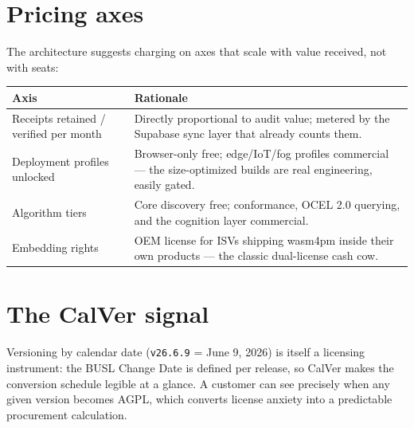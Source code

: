 \section{Pricing axes}

The architecture suggests charging on axes that scale with value received,
not with seats:

\begin{center}
\begin{tabularx}{\textwidth}{lX}
\toprule
\textbf{Axis} & \textbf{Rationale} \\
\midrule
Receipts retained / verified per month & Directly proportional to audit value; metered by the Supabase sync layer that already counts them. \\
Deployment profiles unlocked & Browser-only free; edge/IoT/fog profiles commercial --- the size-optimized builds are real engineering, easily gated. \\
Algorithm tiers & Core discovery free; conformance, OCEL 2.0 querying, and the cognition layer commercial. \\
Embedding rights & OEM license for ISVs shipping wasm4pm inside their own products --- the classic dual-license cash cow. \\
\bottomrule
\end{tabularx}
\end{center}

\section{The CalVer signal}

Versioning by calendar date (\texttt{v26.6.9} = June 9, 2026) is itself a
licensing instrument: the BUSL Change Date is defined per release, so CalVer
makes the conversion schedule legible at a glance. A customer can see
precisely when any given version becomes AGPL, which converts license
anxiety into a predictable procurement calculation.
